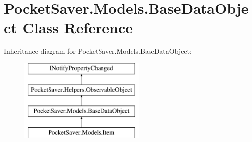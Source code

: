 \hypertarget{class_pocket_saver_1_1_models_1_1_base_data_object}{}\section{Pocket\+Saver.\+Models.\+Base\+Data\+Object Class Reference}
\label{class_pocket_saver_1_1_models_1_1_base_data_object}
Inheritance diagram for Pocket\+Saver.\+Models.\+Base\+Data\+Object\+:\begin{figure}[H]
\begin{center}
\leavevmode
\includegraphics[height=4.000000cm]{class_pocket_saver_1_1_models_1_1_base_data_object}
\end{center}
\end{figure}
